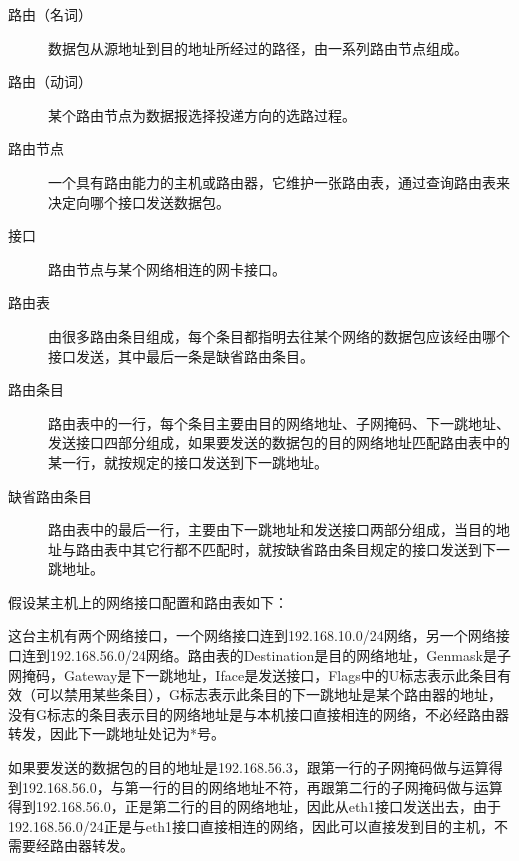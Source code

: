 \begin{description}
\item[{路由（名词）}]


数据包从源地址到目的地址所经过的路径，由一系列路由节点组成。

\item[{路由（动词）}]


某个路由节点为数据报选择投递方向的选路过程。

\item[{路由节点}]


一个具有路由能力的主机或路由器，它维护一张路由表，通过查询路由表来决定向哪个接口发送数据包。

\item[{接口}]


路由节点与某个网络相连的网卡接口。

\item[{路由表}]


由很多路由条目组成，每个条目都指明去往某个网络的数据包应该经由哪个接口发送，其中最后一条是缺省路由条目。

\item[{路由条目}]


路由表中的一行，每个条目主要由目的网络地址、子网掩码、下一跳地址、发送接口四部分组成，如果要发送的数据包的目的网络地址匹配路由表中的某一行，就按规定的接口发送到下一跳地址。

\item[{缺省路由条目}]


路由表中的最后一行，主要由下一跳地址和发送接口两部分组成，当目的地址与路由表中其它行都不匹配时，就按缺省路由条目规定的接口发送到下一跳地址。


\end{description}


假设某主机上的网络接口配置和路由表如下：




这台主机有两个网络接口，一个网络接口连到192.\BookSplit{}168.\BookSplit{}10.\BookSplit{}0/\BookSplit{}24网络，另一个网络接口连到192.\BookSplit{}168.\BookSplit{}56.\BookSplit{}0/\BookSplit{}24网络。路由表的Destination是目的网络地址，Genmask是子网掩码，Gateway是下一跳地址，Iface是发送接口，Flags中的U标志表示此条目有效（可以禁用某些条目），G标志表示此条目的下一跳地址是某个路由器的地址，没有G标志的条目表示目的网络地址是与本机接口直接相连的网络，不必经路由器转发，因此下一跳地址处记为*号。



如果要发送的数据包的目的地址是192.\BookSplit{}168.\BookSplit{}56.\BookSplit{}3，跟第一行的子网掩码做与运算得到192.\BookSplit{}168.\BookSplit{}56.\BookSplit{}0，与第一行的目的网络地址不符，再跟第二行的子网掩码做与运算得到192.\BookSplit{}168.\BookSplit{}56.\BookSplit{}0，正是第二行的目的网络地址，因此从eth1接口发送出去，由于192.\BookSplit{}168.\BookSplit{}56.\BookSplit{}0/\BookSplit{}24正是与eth1接口直接相连的网络，因此可以直接发到目的主机，不需要经路由器转发。



